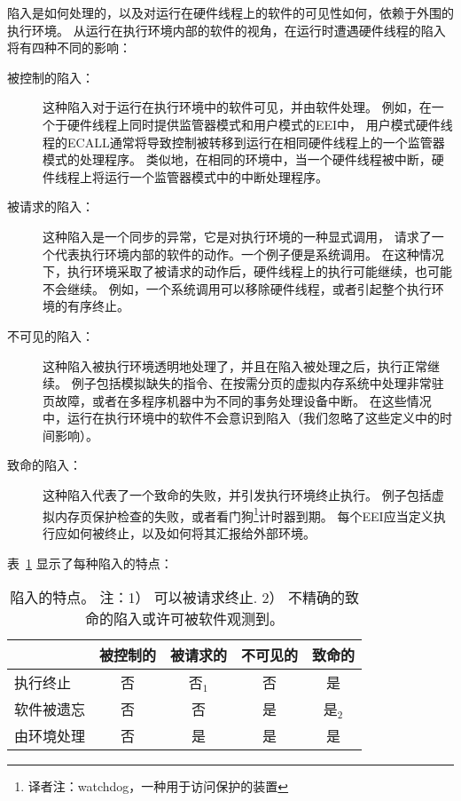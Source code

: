 陷入是如何处理的，以及对运行在硬件线程上的软件的可见性如何，依赖于外围的执行环境。
从运行在执行环境内部的软件的视角，在运行时遭遇硬件线程的陷入将有四种不同的影响：
\begin{description}
  \item[被控制的陷入：] 这种陷入对于运行在执行环境中的软件可见，并由软件处理。
  例如，在一个于硬件线程上同时提供监管器模式和用户模式的EEI中，
  用户模式硬件线程的ECALL通常将导致控制被转移到运行在相同硬件线程上的一个监管器模式的处理程序。
  类似地，在相同的环境中，当一个硬件线程被中断，硬件线程上将运行一个监管器模式中的中断处理程序。
  \item[被请求的陷入：] 这种陷入是一个同步的异常，它是对执行环境的一种显式调用，
  请求了一个代表执行环境内部的软件的动作。一个例子便是系统调用。
  在这种情况下，执行环境采取了被请求的动作后，硬件线程上的执行可能继续，也可能不会继续。
  例如，一个系统调用可以移除硬件线程，或者引起整个执行环境的有序终止。
  \item[不可见的陷入：] 这种陷入被执行环境透明地处理了，并且在陷入被处理之后，执行正常继续。
  例子包括模拟缺失的指令、在按需分页的虚拟内存系统中处理非常驻页故障，或者在多程序机器中为不同的事务处理设备中断。
  在这些情况中，运行在执行环境中的软件不会意识到陷入（我们忽略了这些定义中的时间影响）。
  \item[致命的陷入：] 这种陷入代表了一个致命的失败，并引发执行环境终止执行。
  例子包括虚拟内存页保护检查的失败，或者看门狗\footnote{译者注：watchdog，一种用于访问保护的装置}计时器到期。
  每个EEI应当定义执行应如何被终止，以及如何将其汇报给外部环境。
\end{description}

表~\ref{table:trapcharacteristics} 显示了每种陷入的特点：

\begin{table}[hbt]
  \centering
  \begin{tabular}{|l|c|c|c|c|}
      \hline
                & 被控制的 & 被请求的 & 不可见的 & 致命的\\
      \hline
      执行终止   & 否     & 否$_{1}$ & 否  & 是 \\
      软件被遗忘 & 否     & 否       & 是 & 是$_{2}$ \\
      由环境处理 & 否     & 是       & 是 & 是 \\
      \hline
  \end{tabular}
  \caption{陷入的特点。 注：1） 可以被请求终止. 2） 不精确的致命的陷入或许可被软件观测到。}
\label{table:trapcharacteristics}
\end{table}

